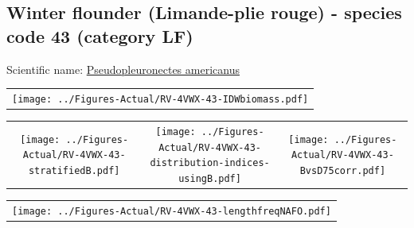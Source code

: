\documentclass[12pt]{article}\usepackage[]{graphicx}\usepackage[]{color}
\begin{document}
\renewcommand\thefigure{\thesubsection\Alph{figure}}

\setcounter{figure}{0}

\hypertarget{sec:43}{%
\subsection{Winter flounder (Limande-plie rouge) - species code 43 (category LF)}\label{sec:43}}

  


Scientific name: \href{http://www.marinespecies.org/aphia.php?p=taxdetails\&id=158885}{Pseudopleuronectes americanus} \newline
\begin{minipage}{1.0\textwidth}
 \begin{tabular}{c}
\texttt{[image: ../Figures-Actual/RV-4VWX-43-IDWbiomass.pdf]} \\ 
\end{tabular} 
\end{minipage}
\newline

\vspace{1cm}
\begin{minipage}{1.0\textwidth}
 \begin{tabular}{ccc}
\texttt{[image: ../Figures-Actual/RV-4VWX-43-stratifiedB.pdf]} & 
\texttt{[image: ../Figures-Actual/RV-4VWX-43-distribution-indices-usingB.pdf]} & 
\texttt{[image: ../Figures-Actual/RV-4VWX-43-BvsD75corr.pdf]} \\ 
\end{tabular} 
\end{minipage}
\clearpage
\begin{minipage}{1.0\textwidth}
 \begin{tabular}{c}
\texttt{[image: ../Figures-Actual/RV-4VWX-43-lengthfreqNAFO.pdf]} \\ 
\end{tabular} 
\end{minipage}
\newline
\end{document}
